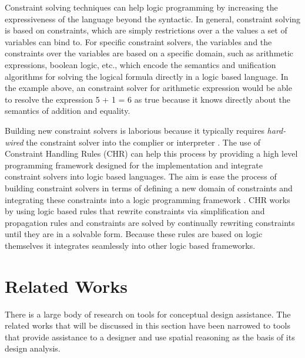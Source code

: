 \documentclass[12pt]{ucthesis}
\begin{document}
Constraint solving techniques can help logic programming by increasing the expressiveness of the language beyond the syntactic. In general, constraint solving is based on constraints, which are simply restrictions over a the values a set of variables can bind to. For specific constraint solvers, the variables and the constraints over the variables are based on a specific domain, such as arithmetic expressions, boolean logic, etc., which encode the semantics and unification algorithms for solving the logical formula directly in a logic based language. In the example above, an constraint solver for arithmetic expression would be able to resolve the expression 5 + 1 = 6 as true because it knows directly about the semantics of addition and equality. 

Building new constraint solvers is laborious because it typically requires \emph{hard-wired} the constraint solver into the complier or interpreter \cite{GavanelliCLP}. The use of Constraint Handling Rules (CHR) can help this process by providing a high level programming framework designed for the implementation and integrate constraint solvers into logic based languages. The aim is ease the process of building constraint solvers in terms of defining a new domain of constraints and integrating these constraints into a logic programming framework \cite{CHR}. CHR works by using logic based rules that rewrite constraints via simplification and propagation rules and constraints are solved by continually rewriting constraints until they are in a solvable form. Because these rules are based on logic themselves it integrates seamlessly into other logic based frameworks. 


\section{Related Works}
\label{related works}
There is a large body of research on tools for conceptual design assistance. The related works that will be discussed in this section have been narrowed to tools that provide assistance to a designer and use spatial reasoning as the basis of its design analysis.

\end{document}
